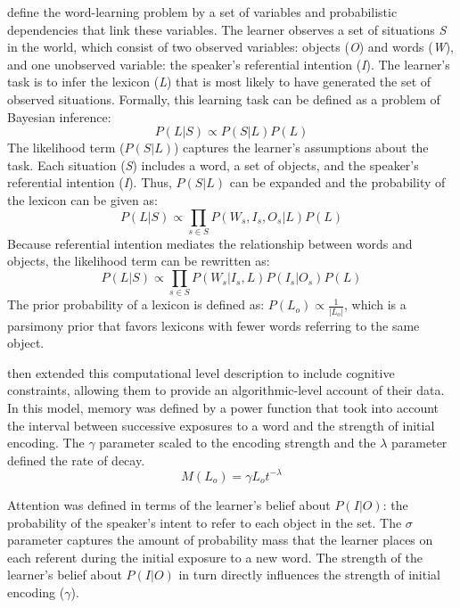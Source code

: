 \documentclass[man]{apa2}
\begin{document}
\citeauthor{frank2009using} define the word-learning problem by a set of variables and probabilistic dependencies that link these variables. The learner observes a set of situations \emph{S} in the world, which consist of two observed variables: objects (\emph{O}) and words (\emph{W}), and one unobserved variable: the speaker's referential intention (\emph{I}). The learner's task is to infer the lexicon (\emph{L}) that is most likely to have generated the set of observed situations. Formally, this learning task can be defined as a problem of Bayesian inference: 
%
\begin{equation}
\label{1}
P(L|S) \propto P(S|L)P(L)
\end{equation}
%
The likelihood term ($P(S|L)$) captures the learner's assumptions about the task. Each situation (\emph{S}) includes a word, a set of objects, and the speaker's referential intention (\emph{I}). Thus, $P(S|L)$ can be expanded and the probability of the lexicon can be given as: 
%
\begin{equation}
\label{2}
P(L|S) \propto \prod\limits_{s \in S}  P(W_s, I_s, O_s|L)P(L)
\end{equation}
%
Because referential intention mediates the relationship between words and objects, the likelihood term can be rewritten as:
%
\begin{equation}
\label{3}
P(L|S) \propto \prod\limits_{s \in S}  P(W_s|I_s, L)P(I_s|O_s)P(L)
\end{equation}
%
The prior probability of a lexicon is defined as: $P(L_o) \propto \frac{1}{|L_o|}$, which is a parsimony prior that favors lexicons with fewer words referring to the same object. 

  then extended this computational level description to include cognitive constraints, allowing them to provide an algorithmic-level account of their data. In this model, memory was defined by a power function that took into account the interval between successive exposures to a word and the strength of initial encoding. The $\gamma$ parameter scaled to the encoding strength and the $\lambda$ parameter defined the rate of decay.
%
\begin{equation}
\label{4}
M(L_o) =  \gamma L_ot^{-\lambda}
\end{equation}
%

Attention was defined in terms of the learner's belief about $P(I|O)$: the probability of the speaker's intent to refer to each object in the set. The $\sigma$ parameter captures the amount of probability mass that the learner places on each referent during the initial exposure to a new word. The strength of the learner's belief about $P(I|O)$ in turn directly influences the strength of initial encoding ($\gamma$). 
\end{document}
